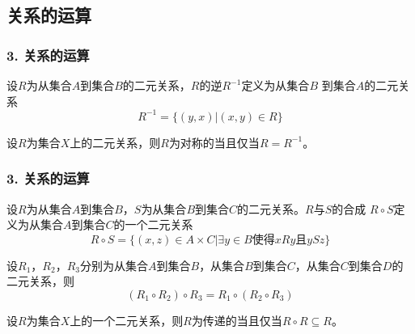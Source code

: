 \documentclass{beamer}
\begin{document}
\begin{CJK*}{UTF8}{gbsn}
\section{关系的运算}
\begin{frame}
  \frametitle{3. 关系的运算}
  \begin{Def}
    设$R$为从集合$A$到集合$B$的二元关系，$R$的\alert{逆}$R^{-1}$定义为从集合$B$
    到集合$A$的二元关系
    \[R^{-1}=\{(y,x)|(x,y)\in R\}\]
  \end{Def}\pause
  \begin{Thm}
    设$R$为集合$X$上的二元关系，则$R$为对称的当且仅当$R=R^{-1}$。
  \end{Thm}  
\end{frame}
\begin{frame}
  \frametitle{3. 关系的运算}
  \begin{Def}\justifying\let\raggedright\justifying
    设$R$为从集合$A$到集合$B$，$S$为从集合$B$到集合$C$的二元关系。$R$与$S$的合成
    $R\circ S$定义为从集合$A$到集合$C$的一个二元关系
    \[R\circ S = \{(x,z)\in A \times C |  \exists y \in B \text{使得} xRy \text{且} ySz\}\]
  \end{Def}\pause
    \begin{Thm}
    设$R_1$，$R_2$，$R_3$分别为从集合$A$到集合$B$，从集合$B$到集合$C$，从集合$C$到集合$D$的二元关系，则
    \[(R_1 \circ R_2)\circ R_3 = R_1 \circ (R_2 \circ R_3)\]
  \end{Thm}\pause
  \begin{Thm}
    设$R$为集合$X$上的一个二元关系，则$R$为传递的当且仅当$R\circ R \subseteq R$。
  \end{Thm}\pause
\end{frame}


\end{CJK*}
\end{document}
